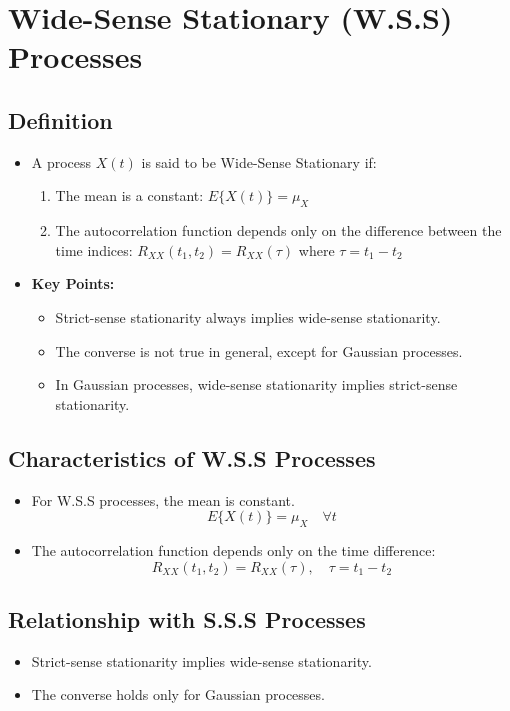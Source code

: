 \documentclass[12pt]{article}
\begin{document}
\section{Wide-Sense Stationary (W.S.S) Processes}

\subsection{Definition}
\begin{itemize}
    \item A process \( X(t) \) is said to be Wide-Sense Stationary if:
    \begin{enumerate}[label=(i)]
        \item The mean is a constant: \( E\{X(t)\} = \mu_X \)
        \item The autocorrelation function depends only on the difference between the time indices: \( R_{XX}(t_1, t_2) = R_{XX}(\tau) \) where \( \tau = t_1 - t_2 \)
    \end{enumerate}
    \item \textbf{Key Points:}
    \begin{itemize}
        \item Strict-sense stationarity always implies wide-sense stationarity.
        \item The converse is not true in general, except for Gaussian processes.
        \item In Gaussian processes, wide-sense stationarity implies strict-sense stationarity.
    \end{itemize}
\end{itemize}

\subsection{Characteristics of W.S.S Processes}
\begin{itemize}
    \item For W.S.S processes, the mean is constant.
    \[
    E\{X(t)\} = \mu_X \quad \forall t
    \]
    \item The autocorrelation function depends only on the time difference:
    \[
    R_{XX}(t_1, t_2) = R_{XX}(\tau), \quad \tau = t_1 - t_2
    \]
\end{itemize}

\subsection{Relationship with S.S.S Processes}
\begin{itemize}
    \item Strict-sense stationarity implies wide-sense stationarity.
    \item The converse holds only for Gaussian processes.
\end{itemize}
\end{document}
